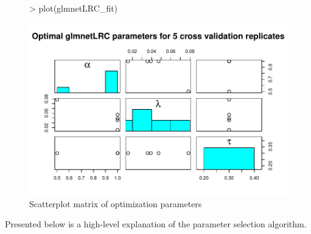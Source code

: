 \documentclass{article}
\begin{document}
\begin{figure}[H]
\begin{center}
\begin{Schunk}
\begin{Sinput}
> plot(glmnetLRC_fit)
\end{Sinput}
\end{Schunk}
\includegraphics{glmnetLRC-plot}
\caption{Scatterplot matrix of optimization parameters}
\end{center}
\end{figure}

\appendix

Presented below is a high-level explanation of the parameter selection algorithm.
\end{document}
